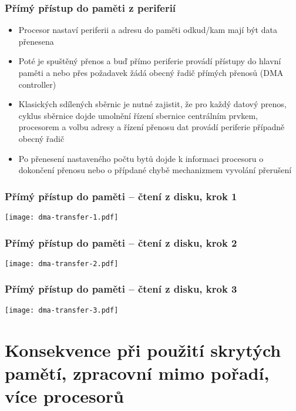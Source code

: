 \documentclass{beamer}
\begin{document}
\begin{frame}
\frametitle{Přímý přístup do paměti z periferií}

\begin{itemize}
 \item Procesor nastaví periferii a adresu do paměti odkud/kam mají být data přenesena
 \item Poté je spuštěný přenos a buď přímo periferie provádí přístupy do hlavní paměti
       a nebo přes požadavek žádá obecný řadič přímých přenosů (DMA controller)
 \item Klasických sdílených sběrnic je nutné zajistit, že pro každý datový prenos, cyklus
       sběrnice dojde umolnění řízení sbernice centrálním prvkem, procesorem a volbu adresy
       a řízení přenosu dat provádí periferie případně obecný řadič
 \item Po přenesení nastaveného počtu bytů dojde k informaci procesoru o dokončení přenosu
       nebo o přípdané chybě mechanizmem vyvolání přerušení
\end{itemize}

\end{frame}

\begin{frame}
\frametitle{Přímý přístup do paměti -- čtení z disku, krok 1}

\begin{center}
  \texttt{[image: dma-transfer-1.pdf]}
\end{center}

\end{frame}


\begin{frame}
\frametitle{Přímý přístup do paměti -- čtení z disku, krok 2}

\begin{center}
  \texttt{[image: dma-transfer-2.pdf]}
\end{center}

\end{frame}

\begin{frame}
\frametitle{Přímý přístup do paměti -- čtení z disku, krok 3}

\begin{center}
  \texttt{[image: dma-transfer-3.pdf]}
\end{center}

\end{frame}

\section{Konsekvence při použití skrytých pamětí, zpracovní mimo pořadí, více procesorů}
\end{document}
